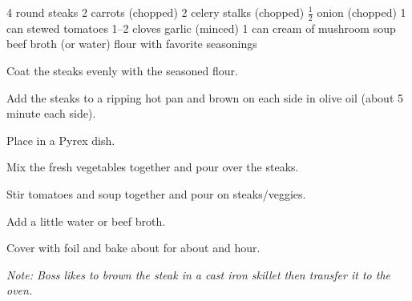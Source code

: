 \dishtype{\main}
\begin{ingreds}
    4 round steaks
    2 carrots (chopped)
    2 celery stalks (chopped)
    $\frac{1}{2}$ onion (chopped)
    1 can stewed tomatoes
    1--2 cloves garlic (minced)
    1 can cream of mushroom soup
    beef broth (or water)
    flour with favorite seasonings
\end{ingreds}
\begin{method}
    Coat the steaks evenly with the seasoned flour.\par
    Add the steaks to a ripping hot pan and brown on each side in olive oil (about 5 minute each side).\par
    Place in a Pyrex\textsuperscript{\textregistered} dish.\par
    Mix the fresh vegetables together and pour over the steaks.\par
    Stir tomatoes and soup together and pour on steaks/veggies.\par
    Add a little water or beef broth.\par
    Cover with foil and bake about for about and hour.\par
    \emph{Note: Boss likes to brown the steak in a cast iron skillet then transfer it to the oven.}
\end{method}
